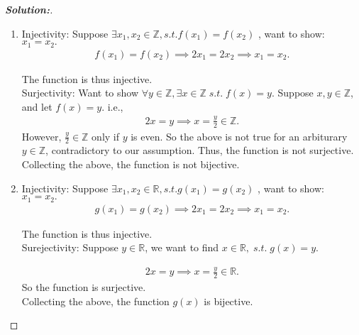 \documentclass[12pt]{article}
\theoremstyle{definition}\newtheorem{problem}{Problem}
\newenvironment{solution}{\begin{proof}[\bfseries\textup{Solution:}]}{\end{proof}}
\newcommand{\Z}{\mathbb{Z}}
\newcommand{\R}{\mathbb{R}}
\begin{document}
\begin{solution} 
\begin{enumerate}
\item Injectivity: Suppose $ \exists x_1, x_2 \in \Z, s.t. f(x_1) = f(x_2)  $ , want to show: $  x_1 = x_2 .$ 
    \begin{align} 
        f(x_1) = f(x_2) \implies 2x_1 = 2x_2 \implies x_1 = x_2. 
    \end{align}
    
    The function is thus injective.\\
    
Surjectivity: Want to show $ \forall y \in \Z, \exists x \in \Z \; s.t. \; f(x) = y . $ Suppose $x, y \in \Z $, and let $ f(x) = y $. i.e., \begin{align} 
    2x = y \implies x = \frac{y}{2} \in \Z. 
\end{align}
However, $ \frac{y}{2} \in \Z $ only if $ y $ is even. So the above is not true for an arbiturary $ y \in \Z $, contradictory to our assumption. Thus, the function is not surjective.
\\

Collecting the above, the function is not bijective.
\\

\item Injectivity: Suppose $ \exists x_1, x_2 \in \R, s.t. g(x_1) = g(x_2)  $ , want to show: $  x_1 = x_2 .$ 
    \begin{align} 
        g(x_1) = g(x_2) \implies 2x_1 = 2x_2 \implies x_1 = x_2. 
    \end{align}
    
    The function is thus injective.\\


Surejectivity: Suppose $ y \in \R $, we want to find $ x \in \R, \; s.t.\; g(x) = y $.

\begin{align} 
    2x = y \implies x = \frac{y}{2} \in \R.
\end{align}
So the function is surjective.\\

Collecting the above, the function $ g(x) $ is bijective.

\end{enumerate} 


\end{solution}
\end{document}
